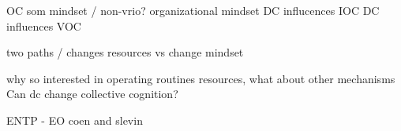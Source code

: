 



OC som mindset / non-vrio? organizational mindset
DC influcences IOC 
DC influences VOC


two paths / changes resources vs change mindset

why so interested in operating routines resources, what about other mechanisms
Can dc change collective cognition? 

ENTP - EO coen and slevin



